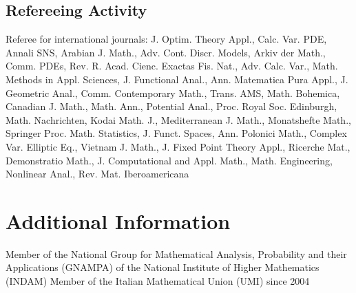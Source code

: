 \documentclass[11pt,a4paper,sans,colorlinks,linkcolor=green]{moderncv}
\begin{document}
\subsection{Refereeing Activity}
 {Referee for international journals: J. Optim. Theory Appl., Calc. Var. PDE, Annali SNS, Arabian J. Math., Adv. Cont. Discr. Models, Arkiv der Math., Comm. PDEs, Rev. R. Acad. Cienc. Exactas Fis. Nat., Adv. Calc. Var., Math. Methods in Appl. Sciences, J. Functional Anal., Ann. Matematica Pura Appl., J. Geometric Anal., Comm. Contemporary Math., Trans. AMS, Math. Bohemica, Canadian J. Math., Math. Ann., Potential Anal., Proc. Royal Soc. Edinburgh, Math. Nachrichten, Kodai Math. J., Mediterranean J. Math., Monatshefte Math., Springer Proc. Math. Statistics, J. Funct. Spaces, Ann. Polonici Math., Complex Var. Elliptic Eq., Vietnam J. Math., J. Fixed Point Theory Appl., Ricerche Mat., Demonstratio Math., J. Computational and Appl. Math., Math. Engineering, Nonlinear Anal., Rev. Mat. Iberoamericana}

\section{Additional Information}
 {Member of the National Group for Mathematical Analysis, Probability and their Applications (GNAMPA) of the National Institute of Higher Mathematics (INDAM)}
 {Member of the Italian Mathematical Union (UMI) since 2004}
\end{document}
